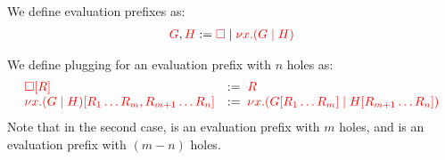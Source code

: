 \begin{definition}\label{def:cp-evaluation-prefixes}
  We define evaluation prefixes as:
  \begin{align*}
    \textcolor{red}{G}, \textcolor{red}{H} := \textcolor{red}{\Box} \mid \textcolor{red}{\nu x.(G \mid H)}
  \end{align*}
\end{definition}
\begin{definition}[Plugging]\label{def:cp-evaluation-prefix-plugging}
  We define plugging for an evaluation prefix with $n$ holes as:
  \[
    \begin{array}{ll}
      \textcolor{red}{{\Box}[{R}]} & := \; \textcolor{red}{R} \\
      \textcolor{red}{{\nu x.(G \mid H)}[{R_1 \dots R_m, R_{m+1} \dots R_{n}}]}
                            & := \; \textcolor{red}{\nu x.({G}[{R_1 \dots R_m}] \mid {H}[{R_{m+1} \dots R_n}])}
    \end{array}
  \]
  Note that in the second case,  is an evaluation prefix with $m$ holes,
  and  is an evaluation prefix with $(m-n)$ holes.
\end{definition}
